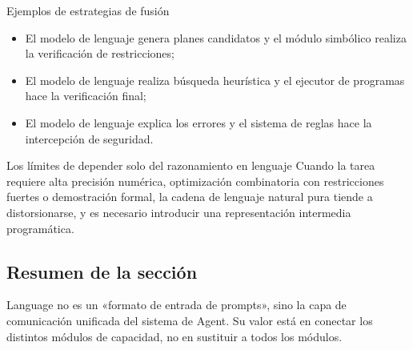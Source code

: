\begin{knowledgebox}{Ejemplos de estrategias de fusión}
\begin{itemize}
    \item El modelo de lenguaje genera planes candidatos y el módulo simbólico realiza la verificación de restricciones;
    \item El modelo de lenguaje realiza búsqueda heurística y el ejecutor de programas hace la verificación final;
    \item El modelo de lenguaje explica los errores y el sistema de reglas hace la intercepción de seguridad.
\end{itemize}
\end{knowledgebox}

\begin{warningbox}{Los límites de depender solo del razonamiento en lenguaje}
Cuando la tarea requiere alta precisión numérica, optimización combinatoria con restricciones fuertes o demostración formal, la cadena de lenguaje natural pura tiende a distorsionarse, y es necesario introducir una representación intermedia programática.
\end{warningbox}

\subsection{Resumen de la sección}
Language no es un «formato de entrada de prompts», sino la capa de comunicación unificada del sistema de Agent. Su valor está en conectar los distintos módulos de capacidad, no en sustituir a todos los módulos.

